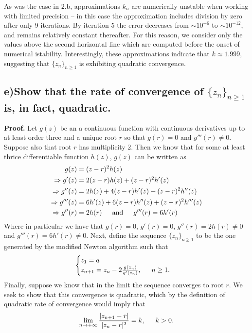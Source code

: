 \documentclass[11pt, letterpaper]{article}
\begin{document}
As was the case in 2.b, approximations $k_n$ are numerically unstable when working with limited
precision -- in this case the approximation includes division by zero after only 9 iterations. By iteration
5 the error decreases from $\sim10^{-6}$ to $\sim10^{-12}$, and remains relatively constant thereafter.
For this reason, we consider only the values above the second horizontal line which are computed before the
onset of numerical istability. Interestingly, these approximations indicate that $k\approx1.999$, suggesting 
that $\{z_n\}_{n\geq 1}$ is exhibiting quadratic convergence. 
\subsection*{e)\normalfont Show that the rate of convergence of $\{z_n\}_{n\geq 1}$ is, in fact, quadratic.}
{\bf Proof.} Let $g(z)$ be an a continuous function with continuous derivatives up to at least order three and a unique root $r$ so that $g(r)=0$ and $g'''(r)\neq 0$. 
Suppose also that root $r$ has multiplicity $2$. Then we know that for some at least thrice differentiable 
function $h(z)$, $g(z)$ can be written as
\begin{align*}
    g(z)&=(z-r)^2h(z)\\
    \Rightarrow g'(z)&=2(z-r)h(z)+(z-r)^2h'(z)\\
    \Rightarrow g''(z)&=2h(z)+4(z-r)h'(z)+(z-r)^2h''(z)\\
    \Rightarrow g'''(z)&=6h'(z)+6(z-r)h''(z)+(z-r)^2h'''(z)\\
    \Rightarrow g''(r)&=2h(r)\text{\indent and\indent}g'''(r)=6h'(r)
\end{align*}
Where in particular we have that $g(r)=0$, $g'(r)=0$, $g''(r)=2h(r)\neq 0$ and $g'''(r)=6h'(r)\neq 0$. Next, define the sequence 
$\{z_n\}_{n\geq 1}$ to be the one generated by the modified Newton algorithm such that
\begin{align*}
    \begin{cases}
        z_1=a\\
        z_{n+1}=z_n-2\frac{g(z_n)}{g'(z_n)}, \text{\indent $n\geq 1$.} 
    \end{cases}
\end{align*}
Finally, suppose we know that in the limit the sequence converges to root $r$. We seek to show that this convergence is quadratic,
which by the definition of quadratic rate of convergence would imply that
\begin{align*}
    \lim_{n\to+\infty}\frac{|z_{n+1}-r|}{|z_n-r|^2}=k,\text{\indent $k>0$.}
\end{align*}
\end{document}
